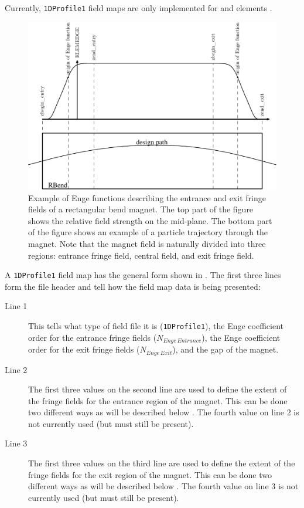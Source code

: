 Currently, \texttt{1DProfile1} field maps are only implemented for  and  elements .

\begin{figure}[tb]
\begin{center}
\includegraphics[width=\textwidth]{./figures/Fieldmaps/profile-1.pdf}
\end{center}
\caption{Example of Enge functions describing the entrance and exit fringe fields of a rectangular bend magnet. The top part of the figure shows the relative field strength on the mid-plane. The bottom part of the figure shows an example of a particle trajectory through the magnet. Note that the magnet field is naturally divided into three regions: entrance fringe field, central field, and exit fringe field.}
\label{fig:rbend_field_profile}
\end{figure}


A \texttt{1DProfile1} field map has the general form shown in . The first three lines form
the file header and tell \opalt how the field map data is being presented:

\begin{description}
\item[Line 1] This tells \opalt what type of field file it is (\texttt{1DProfile1}), the Enge coefficient order
  for the entrance fringe fields ($N_{Enge\,Entrance}$), the Enge coefficient order for the exit fringe fields
  ($N_{Enge\,Exit}$), and the gap of the magnet.
\item[Line 2] The first three values on the second line are used to define the extent of the fringe fields for the
  entrance region of the magnet. This can be done two different ways as will be described below .
  The fourth value on line 2 is not currently used (but must still be present).
\item[Line 3] The first three values on the third line are used to define the extent of the fringe fields for the
  exit region of the magnet. This can be done two different ways as will be described below .
  The fourth value on line 3 is not currently used (but must still be present).
\end{description}

